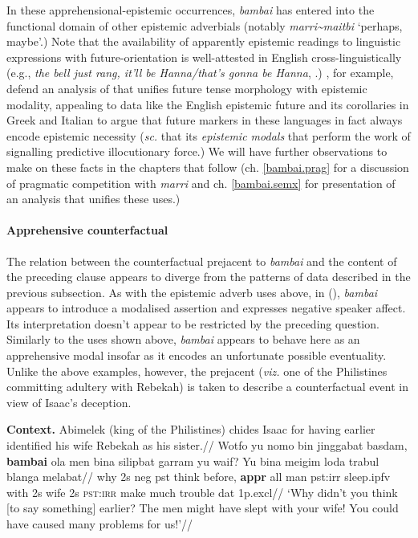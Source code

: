 \noindent In these apprehensional-epistemic occurrences, \textit{bambai} has entered into the functional domain of other epistemic adverbials (notably \textit{marri\textasciitilde{maitbi}} `perhaps, maybe'.) Note that the availability of apparently epistemic readings to linguistic expressions with future-orientation is well-attested in English cross-linguistically (e.g., \textit{the bell just rang, it'll be Hanna/that's gonna be Hanna}, \citealp[see also][]{Condoravdi2003,Winans2016,Werner2006}.) \citet{Giannakidou2018}, for example, defend an analysis of that unifies future tense morphology with epistemic modality, appealing to data like the English epistemic future and its corollaries in Greek and Italian to argue that future markers in these languages in fact always encode epistemic necessity (\textit{sc.} that its \textit{epistemic modals} that perform the work of signalling predictive illocutionary force.) We will have further observations to make on these facts in the chapters that follow (ch. \ref{bambai.prag} for a discussion of pragmatic competition with \textit{marri} and ch. \ref{bambai.semx} for presentation of an analysis that unifies these uses.)

\paragraph[Counterfactual]{Apprehensive counterfactual}

The relation between the counterfactual prejacent to \textit{bambai} and the content of the preceding clause appears to diverge from the patterns of data described in the previous subsection. As with the epistemic adverb uses above, in (), \textit{bambai} appears to introduce a modalised assertion and expresses negative speaker affect. Its interpretation doesn't appear to be restricted by the preceding question. Similarly to the uses shown above, \textit{bambai} appears to behave here as an apprehensive modal insofar as it encodes an unfortunate possible eventuality. Unlike the above examples, however, the prejacent (\textit{viz.} one of the Philistines committing adultery with Rebekah) is taken to describe a counterfactual event in view of Isaac's deception.

\pex\begingl{}\glpreamble\textbf{Context.} Abimelek (king of the Philistines) chides Isaac for having earlier identified his wife Rebekah as his sister.//
 \gla Wotfo yu nomo bin jinggabat basdam, \textbf{bambai} ola men bina silipbat garram yu waif? Yu bina meigim loda trabul blanga melabat//
\glb why 2s \gls{neg} \gls{pst} think before, \textbf{\gls{appr}} all man \gls{pst}:\gls{irr} sleep.\gls{ipfv} with 2s wife 2s \textsc{pst:irr} make much trouble \gls{dat} 1p.\gls{excl}//
\glft`Why didn't you think [to say something] earlier? The men might have slept with your wife! You could have caused many problems for us!'\trailingcitation{[KB~Jen 26.10]}//\endgl
\xe


